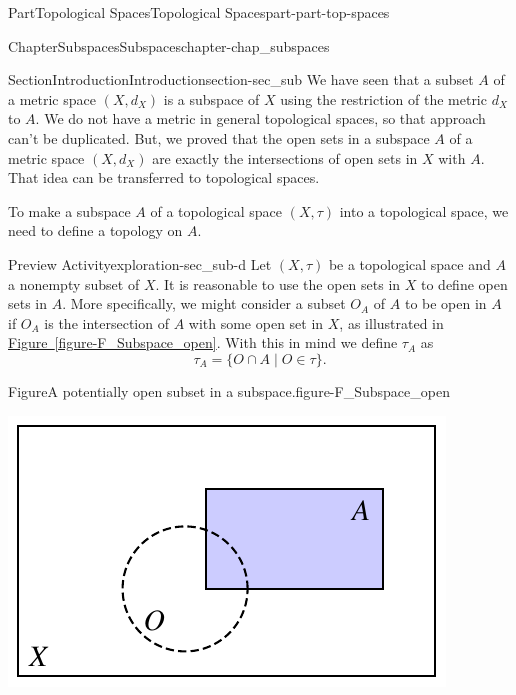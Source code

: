 \documentclass[oneside,10pt,]{book}
\newcommand{\xreffont}{\relax}
\numberwithin{equation}{chapter}
\begin{document}
\begin{partptx}{Part}{Topological Spaces}{}{Topological Spaces}{}{}{part-part-top-spaces}
\begin{chapterptx}{Chapter}{Subspaces}{}{Subspaces}{}{}{chapter-chap_subspaces}
\typeout{************************************************}
%
\begin{sectionptx}{Section}{Introduction}{}{Introduction}{}{}{section-sec_sub}
We have seen that a subset \(A\) of a metric space \((X,d_X)\) is a subspace of \(X\) using the restriction of the metric \(d_X\) to \(A\). We do not have a metric in general topological spaces, so that approach can't be duplicated. But, we proved that the open sets in a subspace \(A\) of a metric space \((X,d_X)\) are exactly the intersections of open sets in \(X\) with \(A\). That idea can be transferred to topological spaces.%
\par
To make a subspace \(A\) of a topological space \((X,\tau)\) into a topological space, we need to define a topology on \(A\).%
\begin{exploration}{Preview Activity}{}{exploration-sec_sub-d}%
Let \((X, \tau)\) be a topological space and \(A\) a nonempty subset of \(X\). It is reasonable to use the open sets in \(X\) to define open sets in \(A\). More specifically, we might consider a subset \(O_A\) of \(A\) to be open in \(A\) if \(O_A\) is the intersection of \(A\) with some open set in \(X\), as illustrated in \hyperref[figure-F_Subspace_open]{Figure~{\xreffont\ref{figure-F_Subspace_open}}}. With this in mind we define \(\tau_A\) as%
\begin{equation*}
\tau_A = \{O \cap A \mid O \in \tau\}\text{.}
\end{equation*}
%
\begin{figureptx}{Figure}{A potentially open subset in a subspace.}{figure-F_Subspace_open}{}%
\begin{image}{0.25}{0.5}{0.25}{}%
\includegraphics[width=\linewidth]{external/Subspace_open.pdf}
\end{image}%

\end{figureptx}
\end{exploration}
\end{sectionptx}
\end{chapterptx}
\end{partptx}
\end{document}
